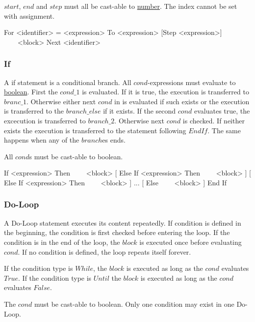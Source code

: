 $start$, $end$ and $step$ must all be cast-able to \hyperref[type:Number]{number}.
The index cannot be set with assignment.

\begin{grammar}
For <identifier> = <expression> To <expression> [Step <expression>]
~~~~<block>
Next <identifier>
\end{grammar}

\subsubsection{If}
\label{stat:if}
A if statement is a conditional branch.
All $cond$-expressions must evaluate to \hyperref[type:Boolean]{boolean}.
First the $cond\_1$ is evaluated.
If it is true, the execution is transferred to $branc\_1$.
Otherwise either next $cond$ in is evaluated if such exists
or the execution is transferred to the $branch\_else$ if it exists.
If the second $cond$ evaluates true, the excecution is transferred to $branch\_2$.
Otherwise next $cond$ is checked.
If neither exists the execution is transferred to the statement following $End If$.
The same happens when any of the $branch$es ends.

All $cond$s must be cast-able to boolean.

\begin{grammar}
If <expression> Then
~~~~<block>
[
Else If <expression> Then
~~~~<block>
]
[
Else If <expression> Then
~~~~<block>
]
...
[
Else
~~~~<block>
]
End If
\end{grammar}

\subsubsection{Do-Loop}
\label{stat:do}
A Do-Loop statement executes its content repeatedly.
If condition is defined in the beginning,
the condition is first checked before entering the loop.
If the condition is in the end of the loop,
the $block$ is executed once before evaluating $cond$.
If no condition is defined,
the loop repeats itself forever.

If the condition type is $While$,
the $block$ is executed as long as the $cond$ evaluates $True$.
If the condition type is $Until$
the $block$ is executed as long as the $cond$ evaluates $False$.

The $cond$ must be cast-able to boolean.
Only one condition may exist in one Do-Loop.


